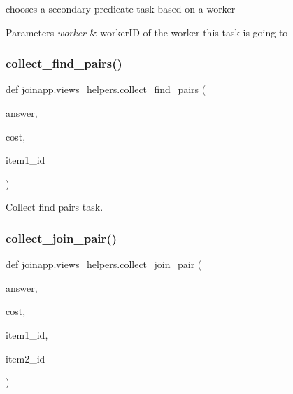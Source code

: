 chooses a secondary predicate task based on a worker 


\begin{DoxyParams}{Parameters}
{\em worker} & worker\+ID of the worker this task is going to \\
\hline
\end{DoxyParams}
\mbox{\label{namespacejoinapp_1_1views__helpers_a6226658bd9bc3aabc7b080290d636ace}} 
\subsubsection{\texorpdfstring{collect\_find\_pairs()}{collect\_find\_pairs()}}
{\footnotesize\ttfamily def joinapp.\+views\+\_\+helpers.\+collect\+\_\+find\+\_\+pairs (\begin{DoxyParamCaption}\item[{}]{answer,  }\item[{}]{cost,  }\item[{}]{item1\+\_\+id }\end{DoxyParamCaption})}



Collect find pairs task. 

\mbox{\label{namespacejoinapp_1_1views__helpers_a30d5f30811b2373f09a4bb38dabfba68}} 
\subsubsection{\texorpdfstring{collect\_join\_pair()}{collect\_join\_pair()}}
{\footnotesize\ttfamily def joinapp.\+views\+\_\+helpers.\+collect\+\_\+join\+\_\+pair (\begin{DoxyParamCaption}\item[{}]{answer,  }\item[{}]{cost,  }\item[{}]{item1\+\_\+id,  }\item[{}]{item2\+\_\+id }\end{DoxyParamCaption})}



